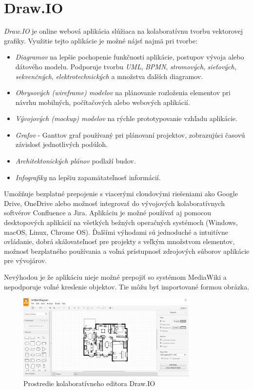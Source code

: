 \section{Draw.IO}
\textit{Draw.IO} je online webová aplikácia slúžiaca na kolaboratívnu tvorbu vektorovej grafiky. Využitie tejto aplikácie je možné nájsť najmä pri tvorbe:
\begin{itemize}
	\item \textit{Diagramov} na lepšie pochopenie funkčnosti aplikácie, postupov vývoja alebo dátového modelu. Podporuje tvorbu \textit{UML}, \textit{BPMN}, \textit{stromových}, \textit{sieťových}, \textit{sekvenčných}, \textit{elektrotechnických} a množstva ďalších diagramov.
	\item \textit{Obrysových (wireframe) modelov} na plánovanie rozloženia elementov pri návrhu mobilných, počítačových alebo webových aplikácií.
	\item \textit{Vývojových (mockup) modelov} na rýchle prototypovanie vzhľadu aplikácie.
	\item \textit{Grafov} - Ganttov graf používaný pri plánovaní projektov, zobrazujúci časovú závislosť jednotlivých podúloh.
	\item \textit{Architektonických plánov} podlaží budov.
	\item \textit{Infografiky} na lepšiu zapamätateľnosť informácií.
\end{itemize}
Umožňuje bezplatné prepojenie s viacerými cloudovými riešeniami ako Google Drive, OneDrive alebo možnosť integrovať do vývojových kolaboratívnych softvérov Confluence a Jira. Aplikáciu je možné používať aj pomocou desktopových aplikácií na všetkých bežných operačných systémoch (Windows, macOS, Linux, Chrome OS). 
Ďalšími výhodami sú jednoduché a intuitívne ovládanie, dobrá skálovateľnosť pre projekty s veľkým množstvom elementov, možnosť bezplatného používania a  voľná prístupnosť zdrojových súborov aplikácie pre vývojárov.

Nevýhodou je že aplikáciu nieje možné prepojiť so systémom MediaWiki a nepodporuje voľné kreslenie objektov. Tie môžu byť importované formou obrázka.

\begin{figure}[h]
	\centerline{\includegraphics[width=0.8\textwidth]{images/drawio}}
	\caption[Editor Draw.IO]{Prostredie kolaboratívneho editora Draw.IO}
	\label{obr:DrawIO}
\end{figure}
\FloatBarrier